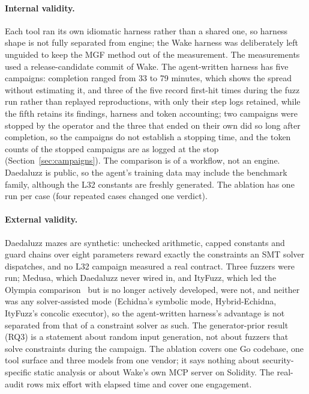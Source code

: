 \documentclass[11pt,a4paper]{article}
\newcommand{\wake}{Wake}
\begin{document}
\paragraph{Internal validity.}
Each tool ran its own idiomatic harness rather than a shared one, so harness shape is not fully separated from engine; the \wake{} harness was deliberately left unguided to keep the MGF method out of the measurement. The measurements used a release-candidate commit of \wake{}. The agent-written harness has five campaigns: completion ranged from 33 to 79 minutes, which shows the spread without estimating it, and three of the five record first-hit times during the fuzz run rather than replayed reproductions, with only their step logs retained, while the fifth retains its findings, harness and token accounting; two campaigns were stopped by the operator and the three that ended on their own did so long after completion, so the campaigns do not establish a stopping time, and the token counts of the stopped campaigns are as logged at the stop (Section~\ref{sec:campaigns}). The comparison is of a workflow, not an engine. Daedaluzz is public, so the agent's training data may include the benchmark family, although the L32 constants are freshly generated. The ablation has one run per case (four repeated cases changed one verdict).

\paragraph{External validity.}
Daedaluzz mazes are synthetic: unchecked arithmetic, capped constants and guard chains over eight parameters reward exactly the constraints an SMT solver dispatches, and no L32 campaign measured a real contract. Three fuzzers were run; Medusa, which Daedaluzz never wired in, and ItyFuzz, which led the Olympia comparison~\cite{chadt2024olympia} but is no longer actively developed, were not, and neither was any solver-assisted mode (Echidna's symbolic mode, Hybrid-Echidna, ItyFuzz's concolic executor), so the agent-written harness's advantage is not separated from that of a constraint solver as such. The generator-prior result (RQ3) is a statement about random input generation, not about fuzzers that solve constraints during the campaign. The ablation covers one Go codebase, one tool surface and three models from one vendor; it says nothing about security-specific static analysis or about \wake{}'s own MCP server on Solidity. The real-audit rows mix effort with elapsed time and cover one engagement.
\end{document}
